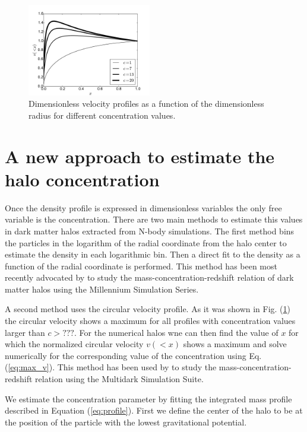 \documentclass[useAMS,usenatbib]{mn2e}
\begin{document}
\begin{figure}
\begin{center}
  \includegraphics[width=0.48\textwidth]{vel_normalized.pdf}
\end{center}
\caption{Dimensionless velocity profiles as a function of the
  dimensionless radius for different concentration values.
    \label{fig:velocity}}
\end{figure}

\section{A new approach to estimate the halo concentration}
\label{sec:method}

Once the density profile is expressed in dimensionless variables the
only free variable is the concentration.
There are two main methods to estimate this values in dark matter
halos extracted from N-body simulations.
The first method bins the particles in the logarithm of the radial
coordinate from the halo center to estimate the density in each
logarithmic bin.
Then a direct fit to the density as a function of the radial
coordinate is performed. This method has been most recently advocated
by \cite{Ludlow2014} to study the mass-concentration-redshift relation
of dark matter halos using the Millennium Simulation Series.

A second method uses the circular velocity profile.
As it was shown in Fig. (\ref{fig:velocity}) the circular velocity
shows a maximum for all profiles with concentration values larger than
$c>???$.
For the numerical halos wne can then find the value of $x$ for which
the normalized circular velocity $v(<x)$ shows a maximum and solve
numerically for the corresponding value of the concentration using
Eq. (\ref{eq:max_v}).  This method has been used by \cite{Klypin2014}
to study the mass-concentration-redshift relation using the Multidark
Simulation Suite.


We estimate the concentration parameter by fitting the
integrated mass profile described in Equation
(\ref{eq:profile}). First we define the center of the halo to be  at
the position of the particle with the lowest gravitational
potential.
\end{document}
